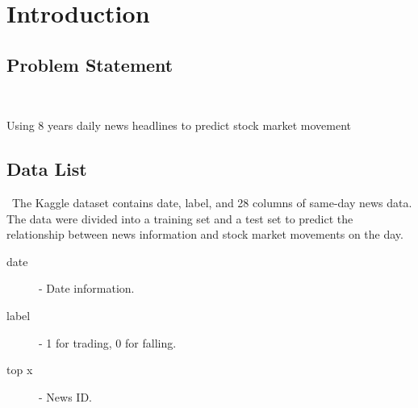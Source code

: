 \section{Introduction}\label{sec-intro}





\subsection{Problem Statement}
\

Using 8 years daily news headlines to predict stock market movement
\subsection{Data List}
\
The Kaggle dataset contains date, label, and 28 columns of same-day news data.
The data were divided into a training set and a test set to 
predict the relationship between news information and 
stock market movements on the day.
\begin{description}
  \item [date] - Date information.
  \item [label] - 1 for trading, 0 for falling.
  \item [top x] - News ID.
\end{description}



